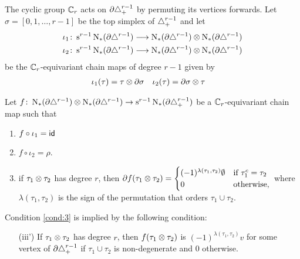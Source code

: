 The cyclic group $\mathbb{C}_r$ acts on $\partial \triangle_{+}^{r-1}$ by permuting its vertices forwards. Let $\sigma = [0,1,\ldots,r-1]$ be the top simplex of $\triangle_{+}^{r-1}$ and let
\begin{align*}
	\iota_1 \colon  \operatorname{s}^{r-1}\operatorname{N}_{*}(\partial \triangle^{r-1})&\longrightarrow \operatorname{N}_{*}(\partial\triangle^{r-1}) \otimes  \operatorname{N}_{*}(\partial\triangle^{r-1})\\
	\iota_2 \colon  \operatorname{s}^{r-1}\operatorname{N}_{*}(\partial \triangle^{r-1})&\longrightarrow \operatorname{N}_{*}(\partial\triangle^{r-1}) \otimes  \operatorname{N}_{*}(\partial\triangle^{r-1})
\end{align*}
be the $\mathbb{C}_r$-equivariant chain maps of degree $r-1$ given by
\begin{align*}
	\iota_1(\tau) &= \tau \otimes  \partial \sigma &
	\iota_2(\tau) &= \partial \sigma \otimes  \tau
\end{align*}
\begin{construction}\label{cons:1} Let $f \colon  \operatorname{N}_{*}(\partial\triangle^{r-1}) \otimes \operatorname{N}_{*}(\partial\triangle^{r-1})\to \operatorname{s}^{r-1}\operatorname{N}_{*}(\partial\triangle_{+}^{r-1})$ be a $\mathbb{C}_r$-equivariant chain map such that
\renewcommand{\theenumi}{\roman{enumi}}
\begin{enumerate}
	\item\label{cond:1} $f\circ \iota_1 = \mathsf{id}$
	\item\label{cond:2} $f\circ \iota_2 = \rho$.
	\item\label{cond:3} if $\tau_1 \otimes \tau_2$ has degree $r$, then $ \partial f(\tau_1 \otimes \tau_2) =
	\begin{cases}
		(-1)^{\lambda(\tau_1,\tau_2)}\emptyset & \text{if $\tau_1^c=\tau_2$} \\
		0 & \text{otherwise},
	\end{cases}$
	where $\lambda(\tau_1,\tau_2)$ is the sign of the permutation that orders $\tau_1\cup \tau_2$.
\end{enumerate}
\end{construction}
\begin{remark}\label{remark:3prime}
	Condition \eqref{cond:3} is implied by the following condition:
	\begin{itemize}
		\item[(iii')] If $\tau_1 \otimes \tau_2$ has degree $r$, then $f(\tau_1 \otimes  \tau_2)$ is $(-1)^{\lambda(\tau_1,\tau_2)} v$ for some vertex of $\partial \triangle_{+}^{r-1}$ if $\tau_1\cup\tau_2$ is non-degenerate and $0$ otherwise.
	\end{itemize}
\end{remark}

